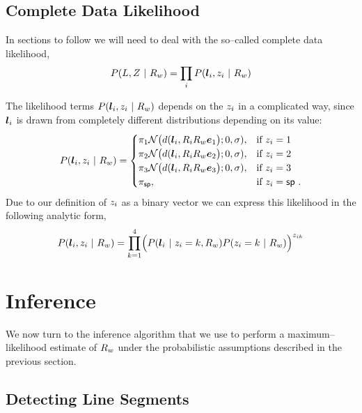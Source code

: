 \subsection{Complete Data Likelihood}

In sections to follow we will need to deal with the so--called
complete data likelihood,
\begin{equation}
  P(\LineSegs,\Indicators ~|~ \SceneR) =
    \prod_i P(\LineSeg_i,\Indicator_i ~|~ \SceneR)
\end{equation}

The likelihood terms $P(\LineSeg_i,\Indicator_i ~|~ \SceneR)$ depends
on the $\Indicator_i$ in a complicated way, since $\LineSeg_i$ is
drawn from completely different distributions depending on its value:
\begin{equation}
  P(\LineSeg_i,\Indicator_i ~|~ \SceneR) =
  \begin{cases}
    \Mixing_1 
    \NormalDistr\bigr(\dist(\LineSeg_i, \CamR_i\SceneR\ex\bigl); 0,\sigma),
      & \mbox{if } \Indicator_i = 1 \\
    \Mixing_2
    \NormalDistr\bigr(\dist(\LineSeg_i, \CamR_i\SceneR\ey\bigl); 0,\sigma),
      & \mbox{if } \Indicator_i = 2 \\
    \Mixing_3
    \NormalDistr\bigr(\dist(\LineSeg_i, \CamR_i\SceneR\ez\bigl); 0,\sigma),
      & \mbox{if } \Indicator_i = 3 \\
    \Mixing_{\Spurious},
      & \mbox{if } \Indicator_i = \Spurious ~.
  \end{cases}
\end{equation}
Due to our definition of $\Indicator_i$ as a binary vector we can
express this likelihood in the following analytic form,
\begin{equation}
  \label{eq:complete-likelihood}
  P(\LineSeg_i,\Indicator_i ~|~ \SceneR) =
  \prod_{k=1}^4 \Bigl( 
    P(\LineSeg_i ~|~ \Indicator_i=k,\SceneR)
    P(\Indicator_i=k ~|~ \SceneR)
  \Bigr)^{\Indicator_{ik}}
\end{equation}

\section{Inference}

We now turn to the inference algorithm that we use to perform a
maximum--likelihood estimate of $\SceneR$ under the probabilistic
assumptions described in the previous section.

\subsection{Detecting Line Segments}

